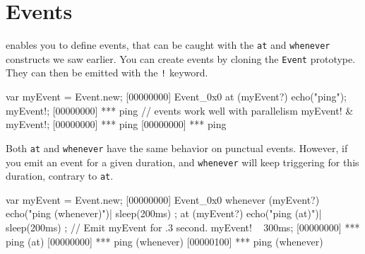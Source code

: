 \section{Events}
\label{sec:tut:events}
\us enables you to define events, that can be caught with the
\lstinline|at| and \lstinline|whenever| constructs we saw earlier. You
can create events by cloning the \lstinline|Event| prototype. They can
then be emitted with the \lstinline|!| keyword.

\begin{urbiscript}
var myEvent = Event.new;
[00000000] Event_0x0
at (myEvent?)
  echo("ping");
myEvent!;
[00000000] *** ping
// events work well with parallelism
myEvent! & myEvent!;
[00000000] *** ping
[00000000] *** ping
\end{urbiscript}

Both \lstinline|at| and \lstinline|whenever| have the same behavior on
punctual events. However, if you emit an event for a given duration,
and \lstinline|whenever| will keep triggering for this duration,
contrary to \lstinline|at|.

\begin{urbiscript}
var myEvent = Event.new;
[00000000] Event_0x0
whenever (myEvent?)
{
  echo("ping (whenever)")|
  sleep(200ms)
};
at (myEvent?)
{
  echo("ping (at)")|
  sleep(200ms)
};
// Emit myEvent for .3 second.
myEvent! ~ 300ms;
[00000000] *** ping (at)
[00000000] *** ping (whenever)
[00000100] *** ping (whenever)
\end{urbiscript}







